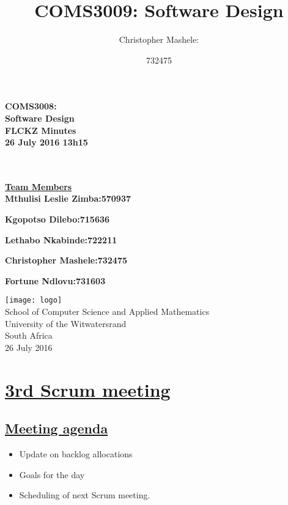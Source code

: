 \documentclass{article}
\title{COMS3009: Software Design}
\author{
	Christopher Mashele:\\
	\and
	732475\\
	}
\begin{document}
\begin{titlepage}
	
		\hspace{0.5cm}
		\huge
		\center
		\textbf{COMS3008:\\ Software Design}\\

		\vspace*{1cm}
		\Large
		\hspace{2cm}
		\center
		\textbf{FLCKZ Minutes\\ 26 July 2016 13h15}\\\\\\
		\vspace*{2cm}
		\normalsize
		\hspace{2.5cm}

		\textbf{\underline{Team Members}}\\

		\textbf{Mthulisi Leslie Zimba:\hfill570937}

		\textbf{Kgopotso Dilebo:\hfill 715636}

		\textbf{Lethabo Nkabinde:\hfill 722211}

		\textbf{Christopher Mashele:\hfill 732475}
		
		\textbf{Fortune Ndlovu:\hfill 731603}

		
		\vspace{2cm}
		\normalsize
		\hspace{4cm}
		\centre
		\texttt{[image: logo]}\\
		\hspace{3cm} School of Computer Science and Applied Mathematics\\
		\hspace{3cm}University of the Witwatersrand\\
		\hspace{3cm} South Africa\\
		\hspace{3cm} 26 July 2016 \\
	
\end{titlepage}

\section*{\underline{3rd Scrum meeting}}
\subsection*{\underline{Meeting agenda}}
\begin{itemize}
	\item Update on backlog allocations
	\item Goals for the day
	\item Scheduling of next Scrum meeting. 
\end{itemize}
\end{document}

